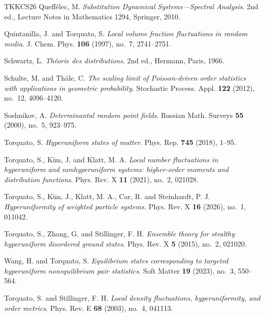 \documentclass[11pt,reqno,a4paper]{amsart}
\numberwithin{equation}{section}
\theoremstyle{compact}
\theoremstyle{definition}
\theoremstyle{definition}
\begin{document}
\begin{thebibliography}{TKKCS26}
Queff\'elec, M.
\newblock \emph{Substitution Dynamical Systems---Spectral Analysis}.
\newblock 2nd ed., Lecture Notes in Mathematics 1294, Springer, 2010.

Quintanilla, J. and Torquato, S.
\newblock \emph{Local volume fraction fluctuations in random media}.
\newblock J. Chem. Phys. \textbf{106} (1997), no.~7, 2741--2751.

Schwartz, L.
\newblock \emph{Th\'eorie des distributions}.
\newblock 2nd ed., Hermann, Paris, 1966.

Schulte, M. and Th\"ale, C.
\newblock \emph{The scaling limit of Poisson-driven order statistics with applications in geometric probability}.
\newblock Stochastic Process. Appl. \textbf{122} (2012), no.~12, 4096--4120.

Soshnikov, A.
\newblock \emph{Determinantal random point fields}.
\newblock Russian Math. Surveys \textbf{55} (2000), no.~5, 923--975.

Torquato, S.
\newblock \emph{Hyperuniform states of matter}.
\newblock Phys. Rep. \textbf{745} (2018), 1--95.

Torquato, S., Kim, J. and Klatt, M. A.
\newblock \emph{Local number fluctuations in hyperuniform and nonhyperuniform systems: higher-order moments and distribution functions}.
\newblock Phys. Rev. X \textbf{11} (2021), no.~2, 021028.

Torquato, S., Kim, J., Klatt, M. A., Car, R. and Steinhardt, P. J.
\newblock \emph{Hyperuniformity of weighted particle systems}.
\newblock Phys. Rev. X \textbf{16} (2026), no.~1, 011042.

Torquato, S., Zhang, G. and Stillinger, F. H.
\newblock \emph{Ensemble theory for stealthy hyperuniform disordered ground states}.
\newblock Phys. Rev. X \textbf{5} (2015), no.~2, 021020.

Wang, H. and Torquato, S.
\newblock \emph{Equilibrium states corresponding to targeted hyperuniform nonequilibrium pair statistics}.
\newblock Soft Matter \textbf{19} (2023), no.~3, 550--564.

Torquato, S. and Stillinger, F. H.
\newblock \emph{Local density fluctuations, hyperuniformity, and order metrics}.
\newblock Phys. Rev. E \textbf{68} (2003), no.~4, 041113.

\end{thebibliography}
\end{document}
